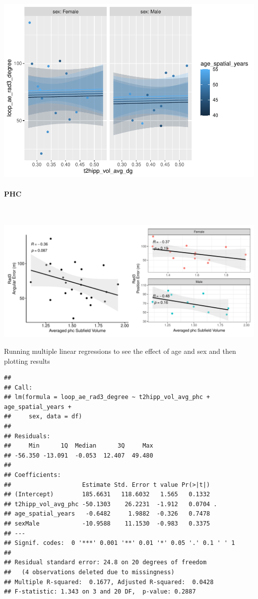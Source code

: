 \documentclass[
]{article}
\begin{document}
\includegraphics{hippocampal_subfield_files/figure-latex/AVG DG + rad3 angular errorMLR-1.pdf}
\vspace{1cm}

\paragraph{PHC}

~ \vspace{1cm}

\includegraphics{hippocampal_subfield_files/figure-latex/unnamed-chunk-11-1.pdf}

\vspace{1cm}

Running multiple linear regressions to see the effect of age and sex and
then plotting results

\begin{verbatim}
## 
## Call:
## lm(formula = loop_ae_rad3_degree ~ t2hipp_vol_avg_phc + age_spatial_years + 
##     sex, data = df)
## 
## Residuals:
##     Min      1Q  Median      3Q     Max 
## -56.350 -13.091  -0.053  12.407  49.480 
## 
## Coefficients:
##                    Estimate Std. Error t value Pr(>|t|)  
## (Intercept)        185.6631   118.6032   1.565   0.1332  
## t2hipp_vol_avg_phc -50.1303    26.2231  -1.912   0.0704 .
## age_spatial_years   -0.6482     1.9882  -0.326   0.7478  
## sexMale            -10.9588    11.1530  -0.983   0.3375  
## ---
## Signif. codes:  0 '***' 0.001 '**' 0.01 '*' 0.05 '.' 0.1 ' ' 1
## 
## Residual standard error: 24.8 on 20 degrees of freedom
##   (4 observations deleted due to missingness)
## Multiple R-squared:  0.1677, Adjusted R-squared:  0.0428 
## F-statistic: 1.343 on 3 and 20 DF,  p-value: 0.2887
\end{verbatim}
\end{document}
